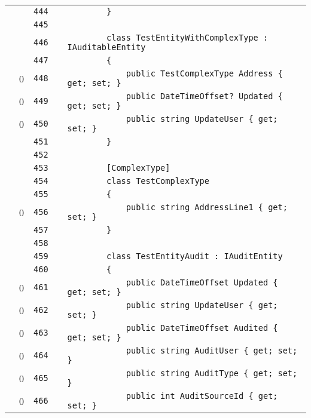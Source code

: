 \documentclass[a4paper,10pt]{article}
\begin{document}
\begin{longtable}[l]{lrrll}
\cellcolor{gray} &  & \verb~444~ & & \verb~        }~\\
\cellcolor{gray} &  & \verb~445~ & & \verb~~\\
\cellcolor{gray} &  & \verb~446~ & & \verb~        class TestEntityWithComplexType : IAuditableEntity~\\
\cellcolor{gray} &  & \verb~447~ & & \verb~        {~\\
\cellcolor{red} & 0 & \verb~448~ & & \verb~            public TestComplexType Address { get; set; }~\\
\cellcolor{red} & 0 & \verb~449~ & & \verb~            public DateTimeOffset? Updated { get; set; }~\\
\cellcolor{red} & 0 & \verb~450~ & & \verb~            public string UpdateUser { get; set; }~\\
\cellcolor{gray} &  & \verb~451~ & & \verb~        }~\\
\cellcolor{gray} &  & \verb~452~ & & \verb~~\\
\cellcolor{gray} &  & \verb~453~ & & \verb~        [ComplexType]~\\
\cellcolor{gray} &  & \verb~454~ & & \verb~        class TestComplexType~\\
\cellcolor{gray} &  & \verb~455~ & & \verb~        {~\\
\cellcolor{red} & 0 & \verb~456~ & & \verb~            public string AddressLine1 { get; set; }~\\
\cellcolor{gray} &  & \verb~457~ & & \verb~        }~\\
\cellcolor{gray} &  & \verb~458~ & & \verb~~\\
\cellcolor{gray} &  & \verb~459~ & & \verb~        class TestEntityAudit : IAuditEntity~\\
\cellcolor{gray} &  & \verb~460~ & & \verb~        {~\\
\cellcolor{red} & 0 & \verb~461~ & & \verb~            public DateTimeOffset Updated { get; set; }~\\
\cellcolor{red} & 0 & \verb~462~ & & \verb~            public string UpdateUser { get; set; }~\\
\cellcolor{red} & 0 & \verb~463~ & & \verb~            public DateTimeOffset Audited { get; set; }~\\
\cellcolor{red} & 0 & \verb~464~ & & \verb~            public string AuditUser { get; set; }~\\
\cellcolor{red} & 0 & \verb~465~ & & \verb~            public string AuditType { get; set; }~\\
\cellcolor{red} & 0 & \verb~466~ & & \verb~            public int AuditSourceId { get; set; }~\\

\end{longtable}
\end{document}
